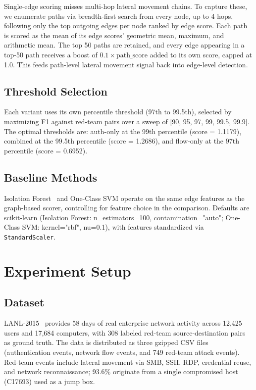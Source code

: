 \documentclass[letterpaper,twocolumn,10pt]{article}
\begin{document}
Single-edge scoring misses multi-hop lateral movement chains. To capture these, we enumerate paths via breadth-first search from every node, up to 4 hops, following only the top outgoing edges per node ranked by edge score. Each path is scored as the mean of its edge scores' geometric mean, maximum, and arithmetic mean. The top 50 paths are retained, and every edge appearing in a top-50 path receives a boost of $0.1 \times \text{path\_score}$ added to its own score, capped at 1.0. This feeds path-level lateral movement signal back into edge-level detection.

\subsection{Threshold Selection}

Each variant uses its own percentile threshold (97th to 99.5th), selected by maximizing F1 against red-team pairs over a sweep of [90, 95, 97, 99, 99.5, 99.9]. The optimal thresholds are: auth-only at the 99th percentile (score = 1.1179), combined at the 99.5th percentile (score = 1.2686), and flow-only at the 97th percentile (score = 0.6952).

\subsection{Baseline Methods}

Isolation Forest~\cite{isoforest} and One-Class SVM operate on the same edge features as the graph-based scorer, controlling for feature choice in the comparison. Defaults are scikit-learn (Isolation Forest: n\_estimators=100, contamination="auto"; One-Class SVM: kernel="rbf", nu=0.1), with features standardized via \texttt{StandardScaler}.

\section{Experiment Setup}

\subsection{Dataset}

LANL-2015~\cite{kent-2015-cyberdata1} provides 58 days of real enterprise network activity across 12,425 users and 17,684 computers, with 308 labeled red-team source-destination pairs as ground truth. The data is distributed as three gzipped CSV files (authentication events, network flow events, and 749 red-team attack events). Red-team events include lateral movement via SMB, SSH, RDP, credential reuse, and network reconnaissance; 93.6\% originate from a single compromised host (C17693) used as a jump box.
\end{document}
